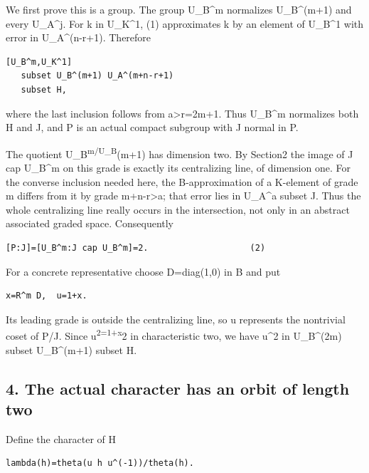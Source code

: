 We first prove this is a group. The group U\_B\^{}m normalizes
U\_B\^{}(m+1) and every U\_A\^{}j. For k in U\_K\^{}1, (1) approximates
k by an element of U\_B\^{}1 with error in U\_A\^{}(n-r+1). Therefore

\begin{Verbatim}[fontsize=\small,breaklines=true,breakanywhere=true]
[U_B^m,U_K^1]
   subset U_B^(m+1) U_A^(m+n-r+1)
   subset H,
\end{Verbatim}

where the last inclusion follows from a\textgreater r=2m+1. Thus
U\_B\^{}m normalizes both H and J, and P is an actual compact subgroup
with J normal in P.

The quotient U\_B\textsuperscript{m/U\_B}(m+1) has dimension two. By
Section2 the image of J cap U\_B\^{}m on this grade is exactly its
centralizing line, of dimension one. For the converse inclusion needed
here, the B-approximation of a K-element of grade m differs from it by
grade m+n-r\textgreater a; that error lies in U\_A\^{}a subset J. Thus
the whole centralizing line really occurs in the intersection, not only
in an abstract associated graded space. Consequently

\begin{Verbatim}[fontsize=\small,breaklines=true,breakanywhere=true]
[P:J]=[U_B^m:J cap U_B^m]=2.                    (2)
\end{Verbatim}

For a concrete representative choose D=diag(1,0) in B and put

\begin{Verbatim}[fontsize=\small,breaklines=true,breakanywhere=true]
x=R^m D,  u=1+x.
\end{Verbatim}

Its leading grade is outside the centralizing line, so u represents the
nontrivial coset of P/J. Since u\textsuperscript{2=1+x}2 in
characteristic two, we have u\^{}2 in U\_B\^{}(2m) subset U\_B\^{}(m+1)
subset H.

\hypertarget{rank4-the-actual-character-has-an-orbit-of-length-two}{%
\subsection{4. The actual character has an orbit of length
two}\label{rank4-the-actual-character-has-an-orbit-of-length-two}}

Define the character of H

\begin{Verbatim}[fontsize=\small,breaklines=true,breakanywhere=true]
lambda(h)=theta(u h u^(-1))/theta(h).
\end{Verbatim}

